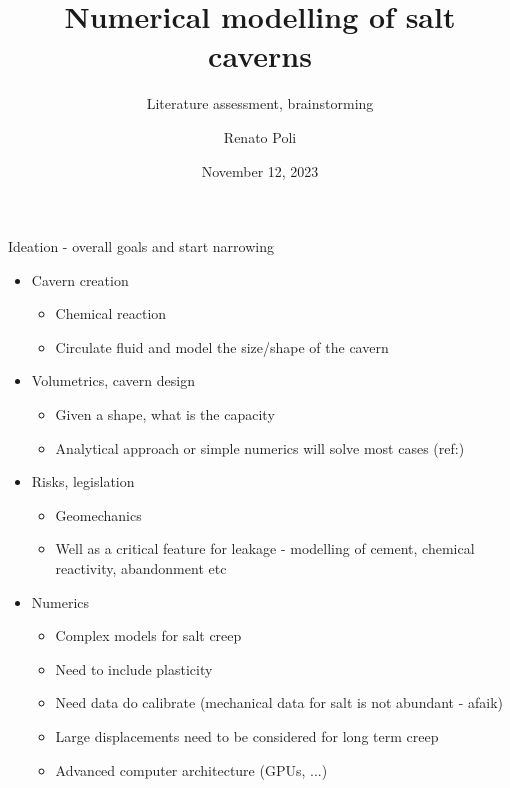 

\usepackage{graphicx}
\graphicspath{ {../multimedia/} }


\title[Num modelling of salt caverns]{Numerical modelling of salt caverns}
\subtitle{Literature assessment, brainstorming}
\author[RPoli]{Renato Poli}
\date{November 12, 2023}



\maketitle


\begin{frame}{Ideation - overall goals and start narrowing}
\begin{itemize}
\item Cavern creation
	\begin{itemize}
	\item Chemical reaction
	\item Circulate fluid and model the size/shape of the cavern
	\end{itemize}
\item Volumetrics, cavern design
	\begin{itemize}
	\item Given a shape, what is the capacity
	\item Analytical approach or simple numerics will solve most cases (ref:\cite{maraggi23})
	\end{itemize}
\item Risks, legislation
	\begin{itemize}
	\item Geomechanics
	\item Well as a critical feature for leakage - modelling of cement, chemical reactivity, abandonment etc
	\end{itemize}
\item Numerics
	\begin{itemize}
	\item Complex models for salt creep
	\item Need to include plasticity
	\item Need data do calibrate (mechanical data for salt is not abundant - afaik)
	\item Large displacements need to be considered for long term creep
	\item Advanced computer architecture (GPUs, ...)
	\end{itemize}
\end{itemize}
\end{frame}


